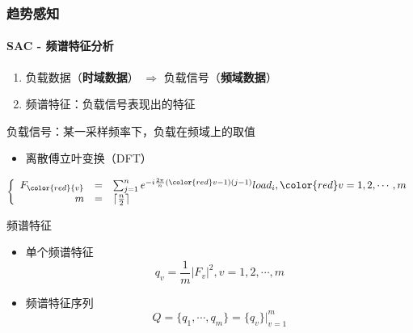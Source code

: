 \begin{frame}
\frametitle{趋势感知}
\framesubtitle{SAC - 频谱特征分析}
\begin{enumerate}[1]
    \item 负载数据（\textbf{时域数据}） $\Rightarrow$ 负载信号（\textbf{频域数据}）
    \item 频谱特征：负载信号表现出的特征
\end{enumerate}
\begin{block}{负载信号：某一采样频率下，负载在频域上的取值}
    \begin{itemize}
    \item 离散傅立叶变换（DFT）
    \end{itemize}
    \begin{equation}
    \left\{
        \begin{array}{rcl}
        F_{\color{red}{v}} &=& \sum_{j=1}^{n} e^{-i\frac{2\pi}{n}({\color{red}v}-1)(j-1)}load_i,
        {\color{red}v=1,2,\cdots,m} \\
        m &=& \lceil \frac{n}{2} \rceil
        \end{array}
    \right.
    \end{equation}
\end{block}
\begin{block}{频谱特征}
\begin{itemize}
    \item 单个频谱特征
    \begin{equation}
        q_v = \frac{1}{m}\left|F_v \right|^2,v=1,2,\cdots,m
    \end{equation}
    \item 频谱特征序列
    \begin{equation}
        Q = \{q_1,\cdots,q_m\} = \{q_v\}|^m_{v=1}
    \end{equation}
\end{itemize}
\end{block}
\bigskip
\end{frame}

